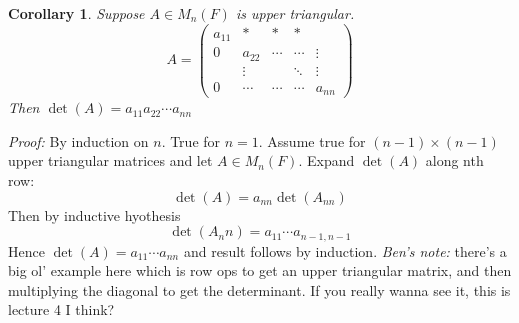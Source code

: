 \documentclass{report}
\newtheorem*{corollary}{Corollary}
\theoremstyle{remark}
\theoremstyle{definition}
\theoremstyle{definition}
\theoremstyle{theorem}
\begin{document}
\begin{corollary}
Suppose $A \in M_n(F)$ is upper triangular.
\[A = \begin{pmatrix}
a_{11}&*&*&*\\
0&a_{22}&\cdots&\cdots&\vdots\\
&\vdots&&\ddots&\vdots\\
0&\cdots&\cdots&\cdots&a_{nn}
\end{pmatrix}\]
Then $\det(A)=a_{11}a_{22}\cdots a_{nn}$
\end{corollary}
\emph{Proof:} By induction on $n$. True for $n=1$. Assume true for $(n-1) \times (n-1)$ upper triangular matrices and let $A \in M_n(F)$. Expand $\det(A)$ along nth row:
\[\det(A)=a_{nn}\det(A_{nn})\]
Then by inductive hyothesis
\[\det(A_nn)=a_{11}\cdots a_{n-1, n-1}\]
Hence $\det(A) = a_{11} \cdots a_{nn}$ and result follows by induction.
\emph{Ben's note:} there's a big ol' example here which is row ops to get an upper triangular matrix, and then multiplying the diagonal to get the determinant. If you really wanna see it, this is lecture 4 I think?
\end{document}
